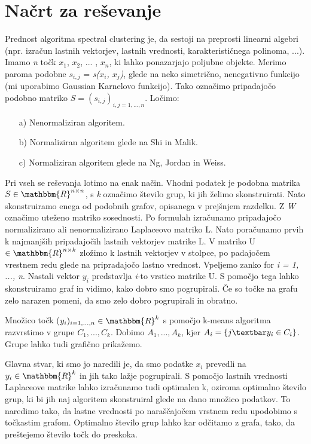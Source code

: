 \documentclass[a4paper, 10pt]{article}
\begin{document}
\section{Načrt za reševanje}
Prednost algoritma spectral clustering je, da sestoji na preprosti linearni algebri (npr. izračun lastnih vektorjev, lastnih vrednosti, karakterističnega polinoma, ...). Imamo \textsl{n} točk $x_1$, $x_2$, ... , $x_n$, ki lahko ponazarjajo poljubne objekte. Merimo paroma podobne  \textsl{$s_{i,j}$} =  \textsl{s($x_i$, $x_j$)}, glede na neko simetrično, nenegativno funkcijo (mi uporabimo Gaussian Karnelovo funkcijo). Tako označimo pripadajočo podobno matriko $S=(s_{i,j})_{i,j = 1,..., n}$. Ločimo:
\begin{itemize}
\item[a)] Nenormaliziran algoritem.
\item[b)] Normaliziran algoritem glede na Shi in Malik.
\item[c)] Normaliziran algoritem glede na Ng, Jordan in Weiss.
\end{itemize}
Pri vseh se reševanja lotimo na enak način. Vhodni podatek je podobna matrika $S\in\mathbbm{ R}^{n\times n}$, s  \textsl{k} označimo število grup, ki jih želimo skonstruirati. Nato skonstruiramo enega od podobnih grafov, opisanega v prejšnjem razdelku. Z \textsl{W} označimo uteženo matriko sosednosti. Po formulah izračunamo pripadajočo normalizirano ali nenormalizirano Laplaceovo matriko L. Nato poračunamo prvih k najmanjših pripadajočih lastnih vektorjev matrike L. V matriko U $\in \mathbbm{R}^{n \times k}$ zložimo k lastnih vektorjev v stolpce, po padajočem vrestnem redu glede na pripradajočo lastno vrednost. Vpeljemo zanko for \textsl{i = 1, ..., n}. Nastali vektor $y_i$ predstavlja \textsl{i}-to vrstico matrike U. S pomočjo tega lahko skonstruiramo graf in vidimo, kako dobro smo pogrupirali. Če so točke na grafu zelo narazen pomeni, da smo zelo dobro pogrupirali in obratno.

Množico točk ($y_i)_{i = 1, ..., n}\in \mathbbm{R}^k$ s pomočjo k-means algoritma razvrstimo v grupe $C_1, ..., C_k$. Dobimo $A_1, ..., A_k$, kjer $A_i=\{j\textbar y_i\in C_i\}$. Grupe lahko tudi grafično prikažemo.

Glavna stvar, ki smo jo naredili je, da smo podatke $x_i$ prevedli na $y_i\in \mathbbm{R}^{k}$ in jih tako lažje pogrupirali. S pomočjo lastnih vrednosti Laplaceove matrike lahko izračunamo tudi optimalen k, oziroma optimalno število grup, ki bi jih naj algoritem skonstruiral glede na dano množico podatkov. To naredimo tako, da lastne vrednosti po naraščajočem vrstnem redu upodobimo s točkastim grafom. Optimalno število grup lahko kar odčitamo z grafa, tako, da preštejemo število točk do preskoka. 
\end{document}
